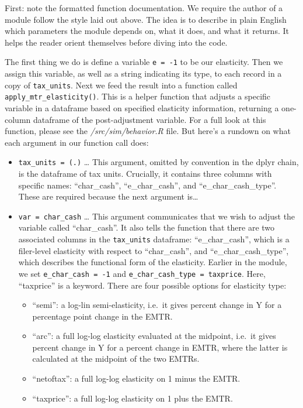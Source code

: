 \documentclass[
]{article}
\begin{document}
First: note the formatted function documentation. We require the author
of a module follow the style laid out above. The idea is to describe in
plain English which parameters the module depends on, what it does, and
what it returns. It helps the reader orient themselves before diving
into the code.

The first thing we do is define a variable \texttt{e\ =\ -1} to be our
elasticity. Then we assign this variable, as well as a string indicating
its type, to each record in a copy of \texttt{tax\_units}. Next we feed
the result into a function called \texttt{apply\_mtr\_elasticity()}.
This is a helper function that adjusts a specific variable in a
dataframe based on specified elasticity information, returning a
one-column dataframe of the post-adjustment variable. For a full look at
this function, please see the \emph{/src/sim/behavior.R} file. But
here's a rundown on what each argument in our function call does:

\begin{itemize}
\item
  \texttt{tax\_units\ =\ (.)} \ldots{} This argument, omitted by
  convention in the dplyr chain, is the dataframe of tax units.
  Crucially, it contains three columns with specific names:
  ``char\_cash'', ``e\_char\_cash'', and ``e\_char\_cash\_type''. These
  are required because the next argument is\ldots{}
\item
  \texttt{var\ =\ \textquotesingle{}char\_cash\textquotesingle{}}
  \ldots{} This argument communicates that we wish to adjust the
  variable called ``char\_cash''. It also tells the function that there
  are two associated columns in the \texttt{tax\_units} dataframe:
  ``e\_char\_cash'', which is a filer-level elasticity with respect to
  ``char\_cash'', and ``e\_char\_cash\_type'', which describes the
  functional form of the elasticity. Earlier in the module, we set
  \texttt{e\_char\_cash\ =\ -1} and
  \texttt{e\_char\_cash\_type\ =\ \textquotesingle{}taxprice\textquotesingle{}}.
  Here, ``taxprice'' is a keyword. There are four possible options for
  elasticity type:

  \begin{itemize}
  \item
    ``semi'': a log-lin semi-elasticity, i.e.~it gives percent change in
    Y for a percentage point change in the EMTR.
  \item
    ``arc'': a full log-log elasticity evaluated at the midpoint,
    i.e.~it gives percent change in Y for a percent change in EMTR,
    where the latter is calculated at the midpoint of the two EMTRs.
  \item
    ``netoftax'': a full log-log elasticity on 1 minus the EMTR.
  \item
    ``taxprice'': a full log-log elasticity on 1 plus the EMTR.
  \end{itemize}
\end{itemize}
\end{document}

